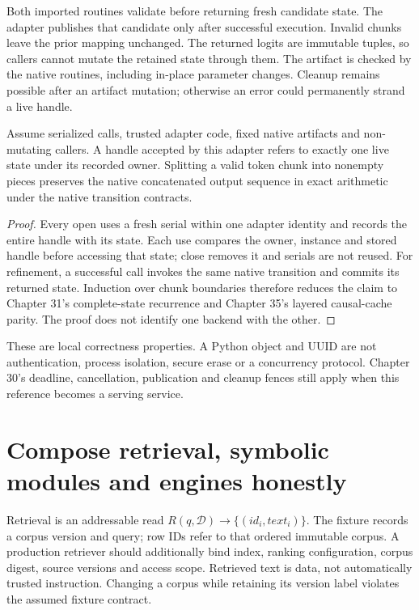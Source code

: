 Both imported routines validate before returning fresh candidate state.
The adapter publishes that candidate only after successful execution.
Invalid chunks leave the prior mapping unchanged. The returned logits are
immutable tuples, so callers cannot mutate the retained state through them.
The artifact is checked by the native routines, including in-place parameter
changes. Cleanup remains possible after an artifact mutation; otherwise an
error could permanently strand a live handle.

\begin{proposition}
Assume serialized calls, trusted adapter code, fixed native artifacts and
non-mutating callers. A handle accepted by this adapter refers to exactly
one live state under its recorded owner. Splitting a valid token chunk into
nonempty pieces preserves the native concatenated output sequence in exact
arithmetic under the native transition contracts.
\end{proposition}
\begin{proof}
Every open uses a fresh serial within one adapter identity and records the
entire handle with its state. Each use compares the owner, instance and stored
handle before accessing that state; close removes it and serials are not reused.
For refinement, a successful call invokes the same native transition and
commits its returned state. Induction over chunk boundaries therefore reduces
the claim to Chapter 31's complete-state recurrence and Chapter 35's layered
causal-cache parity. The proof does not identify one backend with the other.
\end{proof}
These are local correctness properties. A Python object and UUID are not
authentication, process isolation, secure erase or a concurrency protocol.
Chapter 30's deadline, cancellation, publication and cleanup fences still
apply when this reference becomes a serving service.

\section{Compose retrieval, symbolic modules and engines honestly}
\label{evod39:modules}
Retrieval is an addressable read
$R(q,\mathcal D)\to\{(id_i,text_i)\}$.
The fixture records a corpus version and query; row IDs refer to that ordered
immutable corpus. A production retriever should additionally bind index,
ranking configuration, corpus digest, source versions and access scope.
Retrieved text is data, not automatically trusted instruction. Changing a
corpus while retaining its version label violates the assumed fixture contract.

